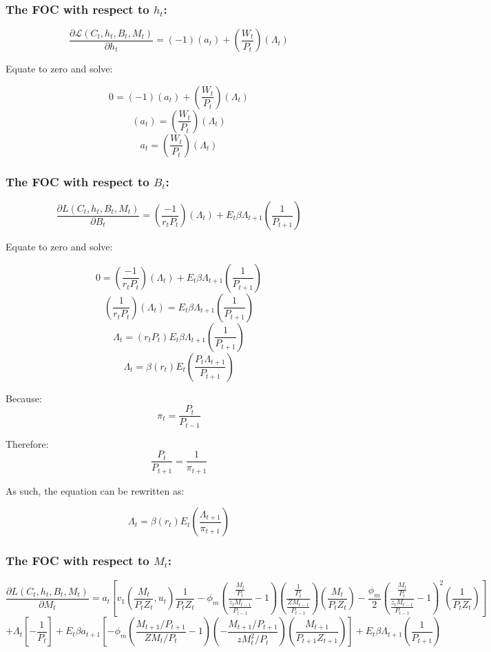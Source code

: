 \documentclass[11pt,preprint, authoryear]{elsarticle}
\numberwithin{equation}{section}
\numberwithin{figure}{section}
\numberwithin{table}{section}
\begin{document}
\hypertarget{the-foc-with-respect-to-h_t}{%
\subsubsection{\texorpdfstring{The FOC with respect to
\(h_t\):}{The FOC with respect to h\_t:}}\label{the-foc-with-respect-to-h_t}}

\[\frac{\partial \mathcal{L}(C_t, h_t, B_t, M_t)}{\partial h_t}= (-1)( a_t) + (\frac{W_t}{P_t})(\Lambda_t)\]

Equate to zero and solve:

\[0 = (-1)( a_t) + (\frac{W_t}{P_t})(\Lambda_t)\]
\[( a_t) = (\frac{W_t}{P_t})(\Lambda_t) \]
\[ a_t = (\frac{W_t}{P_t})(\Lambda_t) \tag{6}\]

\hypertarget{the-foc-with-respect-to-b_t}{%
\subsubsection{\texorpdfstring{The FOC with respect to
\(B_t\):}{The FOC with respect to B\_t:}}\label{the-foc-with-respect-to-b_t}}

\[\frac{\partial L(C_t, h_t, B_t, M_t)}{\partial B_t}= (\frac{-1}{r_t P_t})(\Lambda_t) + E_t\beta \Lambda_{t+1}(\frac{1}{P_{t+1}})\]

Equate to zero and solve:

\[ 0=(\frac{-1}{r_t P_t})(\Lambda_t) + E_t\beta \Lambda_{t+1}(\frac{1}{P_{t+1}})\]
\[ (\frac{1}{r_t P_t})(\Lambda_t) = E_t\beta \Lambda_{t+1}(\frac{1}{P_{t+1}})\]
\[ \Lambda_t = (r_t P_t) E_t\beta\Lambda_{t+1}(\frac{1}{P_{t+1}})\]
\[ \Lambda_t = \beta(r_t) E_t(\frac{P_t\Lambda_{t+1}}{P_{t+1}})\]

Because: \[\pi_t=\frac{P_t}{P_{t-1}}\]

Therefore: \[\frac{P_t}{P_{t+1}}=\frac{1}{\pi_{t+1}}\]

As such, the equation can be rewritten as:

\[\Lambda_t = \beta(r_t)E_t(\frac{\Lambda_{t+1}}{\pi_{t+1}}) \tag{7}\]

\hypertarget{the-foc-with-respect-to-m_t}{%
\subsubsection{\texorpdfstring{The FOC with respect to
\(M_t\):}{The FOC with respect to M\_t:}}\label{the-foc-with-respect-to-m_t}}

\[\frac{\partial L(C_t, h_t, B_t, M_t)}{\partial M_t}=a_t[v_1(\frac{M_t}{P_tZ_t}, u_t) \frac{1}{P_t Z_t}-\phi_m(\frac{\frac{M_t}{P_t}}{\frac{z_tM_{t-1}}{P_{t-1}}}-1)(\frac{\frac{1}{P_{t}}}{\frac{ZM_{t-1}}{P_{t-1}}})(\frac{M_t}{P_tZ_t})-\frac{\phi_m}{2}(\frac{\frac{M_t}{P_t}}{\frac{z_tM_{t-1}}{P_{t-1}}}-1)^2(\frac{1}{P_tZ_t})]\]
\[ + \Lambda_t[-\frac{1}{P_t}] + E_t\beta a_{t+1} \left[-\phi_m(\frac{M_{t+1}/P_{t+1}}{ZM_t/P_t}-1)(-\frac{M_{t+1}/P_{t+1}}{zM_{t}^2/P_{t}})(\frac{M_{t+1}}{P_{t+1}Z_{t+1}}) \right]+E_t \beta \Lambda_{t+1}(\frac{1}{P_{t+1}})\]
\end{document}
